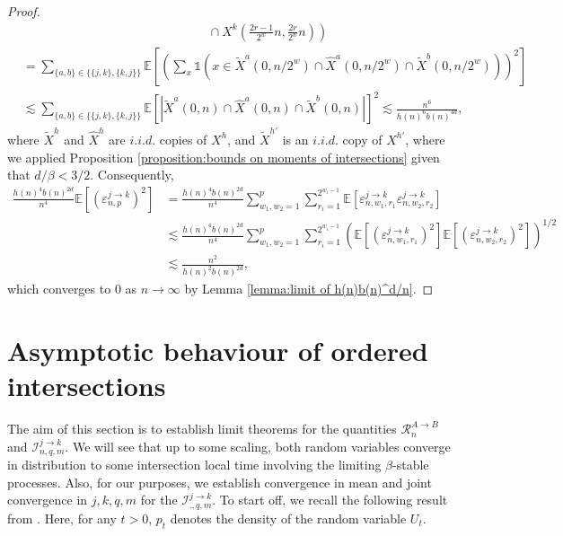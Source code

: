 \documentclass[10pt,a4paper]{amsart}
\newcommand{\R}{\mathcal R}
\newcommand{\I}{\mathcal I}
\newcommand{\EE}{\mathbb E}
\newcommand{\1}{\mathds{1}}
\numberwithin{equation}{section}
\begin{document}
\begin{proof}
\begin{align*}
        &\hspace{15em}\left.\cap\ X^{k}\left(\frac{2r-1}{2^w}n,\frac{2r}{2^w}n\right)\right)\\
        &=\sum_{\{a,b\}\in\{\{j,k\},\{k,j\}\}}
        \EE\left[\left(\sum_{x}\1\left(x\in\widetilde X^a(0,n/2^w)\cap \widehat X^a(0,n/2^w)\cap \widetilde X^{b}(0,n/2^w)\right)\right)^2\right]\\
        &\lesssim\sum_{\{a,b\}\in\{\{j,k\},\{k,j\}\}}\EE\left[\left|\widetilde X^a(0,n)\cap \widehat{X}^a(0,n)\cap \widetilde X^{b}(0,n)\right|\right]^2\lesssim\frac{n^6}{h(n)^6b(n)^{4d}},
    \end{align*}
    where $\widetilde X^h$ and $\widehat X^h$ are $i.i.d.$ copies of $X^h$, and $\widetilde X^{h'}$ is an $i.i.d.$ copy of $X^{h'}$, where we applied Proposition \ref{proposition:bounds on moments of intersections} given that $d/\beta<3/2$. Consequently,
    \begin{align*}
        \frac{h(n)^4b(n)^{2d}}{n^4}\EE\left[(\varepsilon_{n,p}^{j\rightarrow k})^2\right]&=\frac{h(n)^4b(n)^{2d}}{n^4}\sum_{w_1,w_2=1}^p\sum_{r_i=1}^{2^{w_i-1}}\EE\left[\varepsilon_{n,w_1,r_1}^{j\rightarrow k}\varepsilon_{n,w_2,r_2}^{j\rightarrow k}\right]\\
        &\lesssim\frac{h(n)^4b(n)^{2d}}{n^4}\sum_{w_1,w_2=1}^p\sum_{r_i=1}^{2^{w_i-1}}\left(\EE\left[\left(\varepsilon_{n,w_1,r_1}^{j\rightarrow k}\right)^2\right]\EE\left[\left(\varepsilon_{n,w_2,r_2}^{j\rightarrow k}\right)^2\right]\right)^{1/2}\\
        &\lesssim\frac{n^2}{h(n)^2b(n)^{2d}},
    \end{align*}
    which converges to $0$ as $n\rightarrow\infty$ by Lemma \ref{lemma:limit of h(n)b(n)^d/n}.

\end{proof}

\section{Asymptotic behaviour of ordered intersections}
\label{section:Limit Theorems for R^(A->B) and I^(A->B)}

The aim of this section is to establish limit theorems for the quantities $\R_n^{A\rightarrow B}$ and $\I_{n,q,m}^{j\rightarrow k}$. We will see that up to some scaling, both random variables converge in distribution to some intersection local time involving the limiting $\beta$-stable processes. Also, for our purposes, we establish convergence in mean and joint convergence in $j,k,q,m$ for the $\I_{.,q,m}^{j\rightarrow k}$. To start off, we recall the following result from \cite{LeGallRosenRangeOfStableRandomWalks1991}. Here, for any $t>0$, $p_t$ denotes the density of the random variable $U_t$. 
\end{document}
